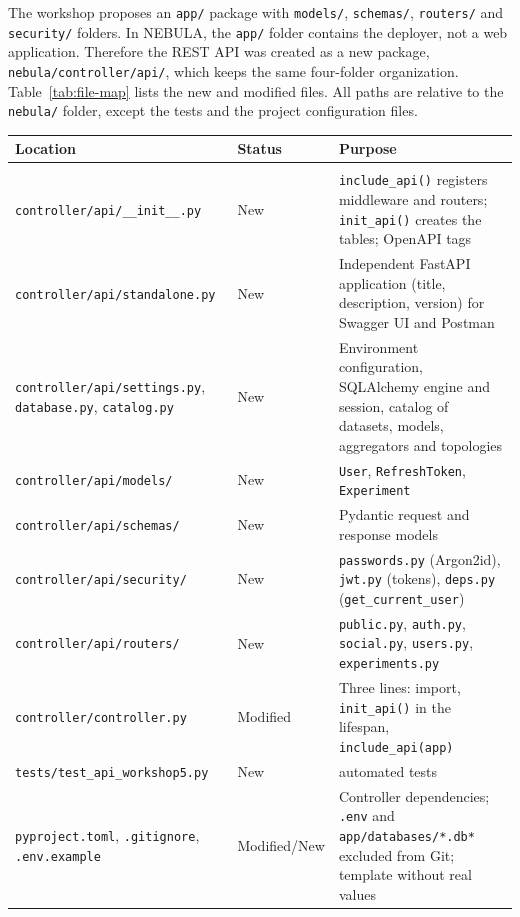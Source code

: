 \documentclass[9pt,a4paper,twocolumn]{article}
\begin{document}
The workshop proposes an \texttt{app/} package with \texttt{models/}, \texttt{schemas/}, \texttt{routers/} and \texttt{security/} folders. In NEBULA, the \texttt{app/} folder contains the deployer, not a web application. Therefore the REST API was created as a new package, \texttt{nebula/controller/api/}, which keeps the same four-folder organization. Table~\ref{tab:file-map} lists the new and modified files. All paths are relative to the \texttt{nebula/} folder, except the tests and the project configuration files.

\begin{table}[t]
\centering
\small
\begin{tabularx}{\textwidth}{>{\raggedright\arraybackslash}X l >{\raggedright\arraybackslash}X}
\hline
\textbf{Location} & \textbf{Status} & \textbf{Purpose} \\
\hline
\multicolumn{3}{l}{\textit{REST API of the workshop}} \\
\texttt{controller/api/\_\_init\_\_.py} & New & \texttt{include\_api()} registers middleware and routers; \texttt{init\_api()} creates the tables; OpenAPI tags \\
\texttt{controller/api/standalone.py} & New & Independent FastAPI application (title, description, version) for Swagger UI and Postman \\
\texttt{controller/api/settings.py}, \texttt{database.py}, \texttt{catalog.py} & New & Environment configuration, SQLAlchemy engine and session, catalog of datasets, models, aggregators and topologies \\
\texttt{controller/api/models/} & New & \texttt{User}, \texttt{RefreshToken}, \texttt{Experiment} \\
\texttt{controller/api/schemas/} & New & Pydantic request and response models \\
\texttt{controller/api/security/} & New & \texttt{passwords.py} (Argon2id), \texttt{jwt.py} (tokens), \texttt{deps.py} (\texttt{get\_current\_user}) \\
\texttt{controller/api/routers/} & New & \texttt{public.py}, \texttt{auth.py}, \texttt{social.py}, \texttt{users.py}, \texttt{experiments.py} \\
\texttt{controller/controller.py} & Modified & Three lines: import, \texttt{init\_api()} in the lifespan, \texttt{include\_api(app)} \\
\texttt{tests/test\_api\_workshop5.py} & New & 22 automated tests \\
\texttt{pyproject.toml}, \texttt{.gitignore}, \texttt{.env.example} & Modified/New & Controller dependencies; \texttt{.env} and \texttt{app/databases/*.db*} excluded from Git; template without real values \\

\end{tabularx}
\end{table}
\end{document}
